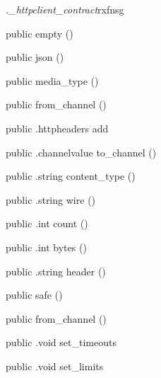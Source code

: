 \begin{CrexxClass}{\textit{.\_httpclient\_contract}}{rxfnsg}

  \begin{Hierarchy}
  \end{Hierarchy}

  \begin{Members}

    \Factory
      {public}
      {empty}
      {()}

    \Factory
      {public}
      {json}
      {()}

    \Factory
      {public}
      {media\_type}
      {()}

    \Factory
      {public}
      {from\_channel}
      {()}

    \Method
      {public}
      {.httpheaders}
      {add}
      {}

    \Method
      {public}
      {.channelvalue}
      {to\_channel}
      {()}

    \Method
      {public}
      {.string}
      {content\_type}
      {()}

    \Method
      {public}
      {.string}
      {wire}
      {()}

    \Method
      {public}
      {.int}
      {count}
      {()}

    \Method
      {public}
      {.int}
      {bytes}
      {()}

    \Method
      {public}
      {.string}
      {header}
      {()}

    \Factory
      {public}
      {safe}
      {()}

    \Factory
      {public}
      {from\_channel}
      {()}

    \Method
      {public}
      {.void}
      {set\_timeouts}
      {}

    \Method
      {public}
      {.void}
      {set\_limits}
      {}


\end{Members}
\end{CrexxClass}

